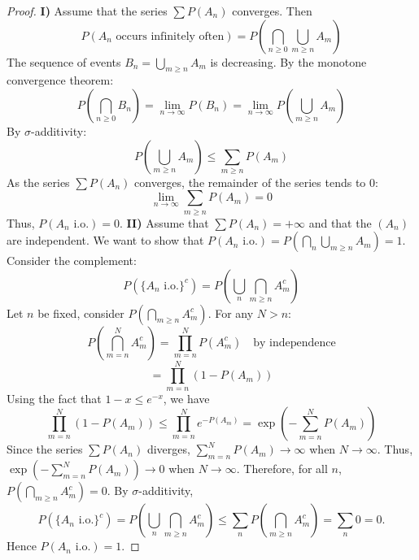 \begin{proof}
\textbf{I)} Assume that the series $\sum P(A_n)$ converges. Then
\begin{equation*}
    P(A_n \text{ occurs infinitely often}) = P(\bigcap_{n \ge 0} \bigcup_{m \ge n} A_m)
\end{equation*}
The sequence of events $B_n = \bigcup_{m \ge n} A_m$ is decreasing.
By the monotone convergence theorem:
\begin{equation*}
    P(\bigcap_{n \ge 0} B_n) = \lim_{n \to \infty} P(B_n) = \lim_{n \to \infty} P(\bigcup_{m \ge n} A_m)
\end{equation*}
By $\sigma$-additivity:
\begin{equation*}
    P(\bigcup_{m \ge n} A_m) \le \sum_{m \ge n} P(A_m)
\end{equation*}
As the series $\sum P(A_n)$ converges, the remainder of the series tends to 0:
\begin{equation*}
    \lim_{n \to \infty} \sum_{m \ge n} P(A_m) = 0
\end{equation*}
Thus, $P(A_n \text{ i.o.}) = 0$.
\vspace{1cm}
\textbf{II)} Assume that $\sum P(A_n) = +\infty$ and that the $(A_n)$ are independent.
We want to show that $P(A_n \text{ i.o.}) = P(\bigcap_{n} \bigcup_{m \ge n} A_m) = 1$.
Consider the complement:
\begin{equation*}
    P(\{A_n \text{ i.o.}\}^c) = P(\bigcup_{n} \bigcap_{m \ge n} A_m^c)
\end{equation*}
Let $n$ be fixed, consider $P(\bigcap_{m \ge n} A_m^c)$.
For any $N > n$:
\begin{equation*}
    P(\bigcap_{m=n}^N A_m^c) = \prod_{m=n}^N P(A_m^c) \quad \text{by independence}
\end{equation*}
\begin{equation*}
    = \prod_{m=n}^N (1 - P(A_m))
\end{equation*}
Using the fact that $1-x \le e^{-x}$, we have
\begin{equation*}
    \prod_{m=n}^N (1 - P(A_m)) \le \prod_{m=n}^N e^{-P(A_m)} = \exp\left(-\sum_{m=n}^N P(A_m)\right)
\end{equation*}
Since the series $\sum P(A_n)$ diverges, $\sum_{m=n}^N P(A_m) \to \infty$ when $N \to \infty$.
Thus, $\exp(-\sum_{m=n}^N P(A_m)) \to 0$ when $N \to \infty$.
Therefore, for all $n$, $P(\bigcap_{m \ge n} A_m^c) = 0$.
By $\sigma$-additivity,
\begin{equation*}
    P(\{A_n \text{ i.o.}\}^c) = P(\bigcup_{n} \bigcap_{m \ge n} A_m^c) \le \sum_n P(\bigcap_{m \ge n} A_m^c) = \sum_n 0 = 0.
\end{equation*}
Hence $P(A_n \text{ i.o.}) = 1$.
\end{proof}%
